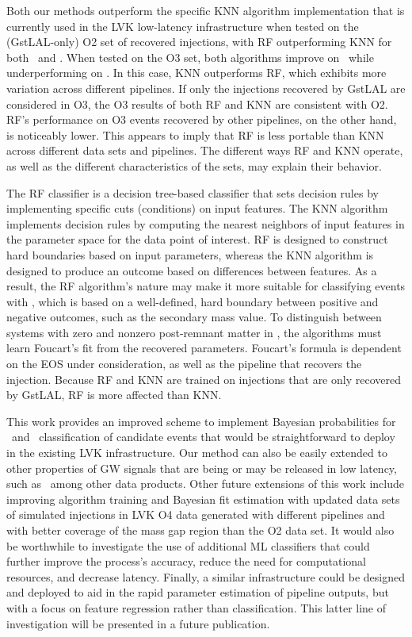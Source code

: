 Both our methods outperform the specific \ac{KNN} algorithm implementation that is currently used in the \ac{LVK} low-latency infrastructure when tested on the (GstLAL-only) \ac{O2} set
of recovered injections, with \ac{RF} outperforming \ac{KNN} for both \hasns\ and \hasrem. When tested on the \ac{O3} set, both algorithms improve on \hasns\ while underperforming on
\hasrem.  In this case, \ac{KNN} outperforms \ac{RF}, which exhibits more variation across different pipelines.  If only the injections recovered by GstLAL are considered in \ac{O3}, the
\ac{O3} results of both \ac{RF} and \ac{KNN} are consistent with \ac{O2}. \ac{RF}'s performance on \ac{O3} events recovered by other pipelines, on the other hand, is noticeably lower.
This appears to imply that \ac{RF} is less portable than \ac{KNN} across different data sets and pipelines. The different ways \ac{RF} and \ac{KNN} operate, as well as the different
characteristics of the sets, may explain their behavior.

The RF classifier is a decision tree-based classifier that sets decision rules by implementing specific cuts (conditions) on input features. The \ac{KNN} algorithm implements decision
rules by computing the nearest neighbors of input features in the parameter space for the data point of interest. \ac{RF} is designed to construct hard boundaries based on input
parameters, whereas the \ac{KNN} algorithm is designed to produce an outcome based on differences between features. As a result, the \ac{RF} algorithm's nature may make it more suitable
for classifying events with \hasns, which is based on a well-defined, hard boundary between positive and negative outcomes, such as the secondary mass value. To distinguish between
systems with zero and nonzero post-remnant matter in \hasrem, the algorithms must learn Foucart's fit from the recovered parameters. Foucart's formula is dependent on the \ac{EOS} under
consideration, as well as the pipeline that recovers the injection. Because \ac{RF} and \ac{KNN} are trained on injections that are only recovered by GstLAL, \ac{RF} is more affected than
\ac{KNN}.

This work provides an improved scheme to implement Bayesian probabilities for \hasns\ and \hasrem\ classification of candidate events that would be straightforward to deploy in the
existing LVK infrastructure. Our method can also be easily extended to other properties of \ac{GW} signals that are being or may be released in low latency, such as \hasgap\ among other
data products. Other future extensions of this work include improving algorithm training and Bayesian fit estimation with updated data sets of simulated injections in \ac{LVK} \ac{O4}
data generated with different pipelines and with better coverage of the mass gap region than the \ac{O2} data set. It would also be worthwhile to investigate the use of additional ML
classifiers that could further improve the process's accuracy, reduce the need for computational resources, and decrease latency. Finally, a similar infrastructure could be designed and
deployed to aid in the rapid parameter estimation of pipeline outputs, but with a focus on feature regression rather than classification. This latter line of investigation will be
presented in a future publication.


